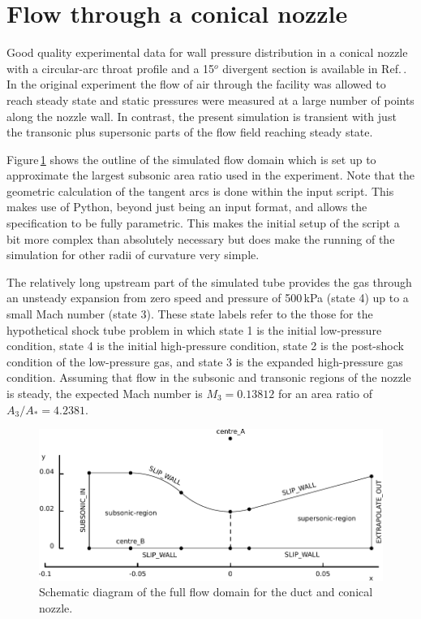 
\newpage
\section{Flow through a conical nozzle}
\label{back-nozzle-sec}
%
Good quality experimental data for wall pressure distribution in a conical
nozzle with a circular-arc throat profile and a 15$^o$ divergent section
is available in Ref.\,\cite{back_etal_1965a}.
In the original experiment the flow of air through the facility 
was allowed to reach steady state and static pressures were measured 
at a large number of points along the nozzle wall.
In contrast, the present simulation is transient with just the transonic 
plus supersonic parts of the flow field reaching steady state.

Figure\,\ref{back-geometry-fig} shows the outline of the simulated flow
domain which is set up to approximate the largest subsonic area ratio
used in the experiment.
Note that the geometric calculation of the tangent arcs is done within the
input script.
This makes use of Python, beyond just being an input format, and allows the
specification to be fully parametric.
This makes the initial setup of the script a bit more complex than absolutely
necessary but does make the running of the simulation for other radii of curvature 
very simple.


The relatively long upstream part of the simulated tube provides the gas 
through an unsteady expansion from zero speed and pressure of 500\,kPa 
(state 4) up to a small Mach number (state 3).
These state labels refer to the those for 
the hypothetical shock tube problem in which 
state 1 is the initial low-pressure condition, 
state 4 is the initial high-pressure condition,
state 2 is the post-shock condition of the low-pressure gas,
and state 3 is the expanded high-pressure gas condition.
Assuming that flow in the subsonic and transonic regions of the nozzle is
steady, the expected Mach number is $M_3 = 0.13812$ for an area ratio of 
$A_3 / A_* = 4.2381$.

\begin{figure}[htbp]
\begin{center}
\includegraphics[width=\textwidth]{../2D/back-nozzle/back-layout.pdf}
\end{center}
\caption{Schematic diagram of the full flow domain for the duct and conical nozzle.}
\label{back-geometry-fig}
\end{figure}

